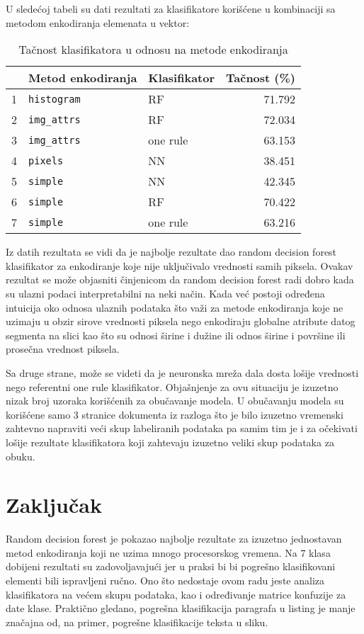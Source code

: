 \documentclass[]{amsart}
\begin{document}
U sledećoj tabeli su dati rezultati za klasifikatore korišćene u kombinaciji sa metodom enkodiranja elemenata u vektor:


\begin{table}
\begin{tabular}{rllr}
 & Metod enkodiranja & Klasifikator & Tačnost (\%)\\
\hline
1 & \texttt{histogram} & RF & 71.792\\
2 & \texttt{img\_attrs} & RF & 72.034\\
3 & \texttt{img\_attrs} & one rule & 63.153\\
4 & \texttt{pixels} & NN & 38.451\\
5 & \texttt{simple} & NN & 42.345\\
6 & \texttt{simple} & RF & 70.422\\
7 & \texttt{simple} & one rule & 63.216\\
\end{tabular}
\caption{Tačnost klasifikatora u odnosu na metode enkodiranja}
\end{table}

Iz datih rezultata se vidi da je najbolje rezultate dao random decision forest klasifikator za enkodiranje koje nije uključivalo vrednosti samih piksela. Ovakav
rezultat se može objasniti činjenicom da random decision forest radi dobro kada su ulazni podaci interpretabilni na neki način. Kada već postoji određena intuicija
oko odnosa ulaznih podataka što važi za metode enkodiranja koje ne uzimaju u obzir sirove vrednosti piksela nego enkodiraju globalne atribute datog segmenta
na slici kao što su odnosi širine i dužine ili odnos širine i površine ili prosečna vrednost piksela.

Sa druge strane, može se videti da je neuronska mreža dala dosta lošije vrednosti nego referentni one rule klasifikator. Objašnjenje za ovu situaciju je
izuzetno nizak broj uzoraka korišćenih za obučavanje modela. U obučavanju modela su korišćene samo 3 stranice dokumenta iz razloga što je bilo izuzetno vremenski
zahtevno  napraviti veći skup labeliranih podataka pa samim tim je i za očekivati lošije rezultate klasifikatora koji zahtevaju izuzetno veliki skup podataka
za obuku.



\section{Zaključak}
\label{sec:orge359279}

Random decision forest je pokazao najbolje rezultate za izuzetno jednostavan metod enkodiranja koji ne uzima mnogo procesorskog vremena. Na 7 klasa dobijeni
rezultati su zadovoljavajući jer u praksi bi bi pogrešno klasifikovani elementi bili ispravljeni ručno. Ono što nedostaje ovom radu jeste
analiza klasifikatora na većem skupu podataka, kao i određivanje matrice konfuzije za date klase. Praktično gledano, pogrešna klasifikacija paragrafa u listing je manje
značajna od, na primer, pogrešne klasifikacije teksta u sliku.





\end{document}
